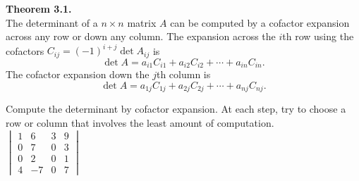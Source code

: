 \newpage

\begin{boxthm}
	\textbf{Theorem 3.1.} \\
	The determinant of a $n\times n$ matrix $A$ can be computed by a cofactor expansion across any row or down any column. The expansion across the $i$th row using the cofactors $C_{ij} = (-1)^{i+j}\det A_{ij}$ is
	$$ \det A = a_{i1}C_{i1} + a_{i2}C_{i2} + \cdots + a_{in}C_{in}. $$
	The cofactor expansion down the $j$th column is
	$$ \det A = a_{1j}C_{1j} + a_{2j}C_{2j} + \cdots + a_{nj}C_{nj}. $$
\end{boxthm}

\begin{exercise} %
	Compute the determinant by cofactor expansion. At each step, try to choose a row or column that involves the least amount of computation. \\
	
	$\begin{vmatrix}1&6&3&9\\0&7&0&3\\0&2&0&1\\4&-7&0&7\end{vmatrix}$
\end{exercise}
\vfill


